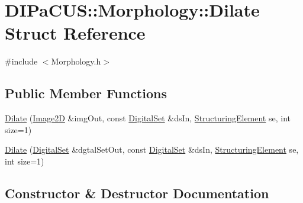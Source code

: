 \hypertarget{structDIPaCUS_1_1Morphology_1_1Dilate}{}\section{D\+I\+Pa\+C\+US\+:\+:Morphology\+:\+:Dilate Struct Reference}
\label{structDIPaCUS_1_1Morphology_1_1Dilate}


{\ttfamily \#include $<$Morphology.\+h$>$}

\subsection*{Public Member Functions}
\begin{DoxyCompactItemize}
\item 
\mbox{\hyperlink{structDIPaCUS_1_1Morphology_1_1Dilate_a1a26d9e62594281a80a9a32d0b166a6b}{Dilate}} (\mbox{\hyperlink{namespaceDIPaCUS_1_1Morphology_a9aff9edf28d681accfc54435fbefcbee}{Image2D}} \&img\+Out, const \mbox{\hyperlink{namespaceDIPaCUS_1_1Morphology_ab69fa725716b0ed4c311c0d00a292be7}{Digital\+Set}} \&ds\+In, \mbox{\hyperlink{namespaceDIPaCUS_1_1Morphology_a60b552d68432e7992f09717070d9c4e7}{Structuring\+Element}} se, int size=1)
\item 
\mbox{\hyperlink{structDIPaCUS_1_1Morphology_1_1Dilate_a66ac7cd8c532a65e3399a889df30b2da}{Dilate}} (\mbox{\hyperlink{namespaceDIPaCUS_1_1Morphology_ab69fa725716b0ed4c311c0d00a292be7}{Digital\+Set}} \&dgtal\+Set\+Out, const \mbox{\hyperlink{namespaceDIPaCUS_1_1Morphology_ab69fa725716b0ed4c311c0d00a292be7}{Digital\+Set}} \&ds\+In, \mbox{\hyperlink{namespaceDIPaCUS_1_1Morphology_a60b552d68432e7992f09717070d9c4e7}{Structuring\+Element}} se, int size=1)
\end{DoxyCompactItemize}


\subsection{Constructor \& Destructor Documentation}
\mbox{\label{structDIPaCUS_1_1Morphology_1_1Dilate_a1a26d9e62594281a80a9a32d0b166a6b}} 
